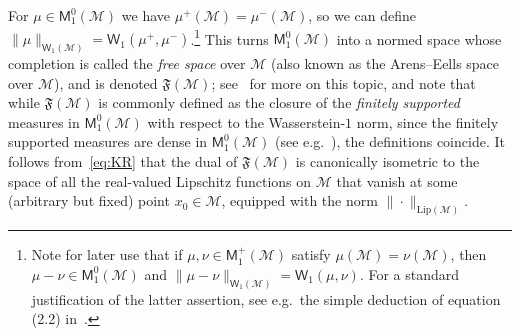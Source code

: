 \documentclass[11pt,reqno]{amsart}
\theoremstyle{remark}
\newcommand{\MM}{\mathcal{M}}
\newcommand{\W}{\mathsf{W}}
\newcommand{\Lip}{\mathrm{Lip}}
\renewcommand{\1}{\mathbf 1}
\begin{document}
 For $\mu\in \mathsf{M}_1^0(\MM)$ we have $\mu^+(\MM)=\mu^-(\MM)$, so we can  define $\|\mu\|_{\W_1(\MM)}= \W_1(\mu^+,\mu^-)$.\footnote{Note for later use  that if $\mu,\nu \in \mathsf{M}^+_1(\MM)$ satisfy $\mu(\MM)=\nu(\MM)$, then $\mu-\nu\in \mathsf{M}_1^0(\MM)$ and  $\|\mu-\nu\|_{\W_1(\MM)}=\W_1(\mu,\nu)$. For a standard justification of the latter assertion, see e.g.~the simple deduction of equation (2.2) in~\cite{NS07}.}  This turns $\mathsf{M}_1^0(\MM)$ into a normed space whose completion is called the {\em free space} over $\MM$ (also known as the Arens--Eells space over $\MM$), and is denoted  $\mathfrak{F}(\MM)$; see~\cite{AE56,Wea99,God15} for more on this topic, and note that while $\mathfrak{F}(\MM)$ is commonly defined as the closure of the {\em finitely supported} measures in $\mathsf{M}_1^0(\MM)$ with respect to the Wasserstein-$1$ norm, since the finitely supported measures are dense in $\mathsf{M}_1^0(\MM)$ (see e.g.~\cite[Theorem~6.18]{Vil09}), the definitions coincide.  It follows from~\eqref{eq:KR}  that the dual of $\mathfrak{F}(\MM)$ is canonically isometric to the space of all the real-valued Lipschitz functions on $\MM$ that vanish at some (arbitrary but fixed) point $x_0\in \MM$, equipped with the norm $\|\cdot\|_{\Lip(\MM)}$.
\end{document}
